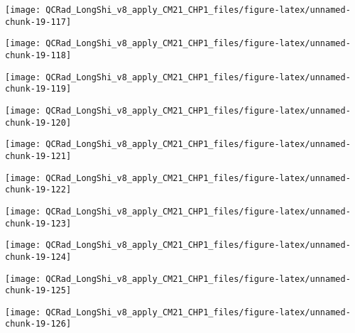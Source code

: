 \documentclass[
  10pt,
  a4paper,oneside]{article}
\begin{document}
\begin{center}\texttt{[image: QCRad\_LongShi\_v8\_apply\_CM21\_CHP1\_files/figure-latex/unnamed-chunk-19-117]} \end{center}

\begin{center}\texttt{[image: QCRad\_LongShi\_v8\_apply\_CM21\_CHP1\_files/figure-latex/unnamed-chunk-19-118]} \end{center}

\begin{center}\texttt{[image: QCRad\_LongShi\_v8\_apply\_CM21\_CHP1\_files/figure-latex/unnamed-chunk-19-119]} \end{center}

\begin{center}\texttt{[image: QCRad\_LongShi\_v8\_apply\_CM21\_CHP1\_files/figure-latex/unnamed-chunk-19-120]} \end{center}

\begin{center}\texttt{[image: QCRad\_LongShi\_v8\_apply\_CM21\_CHP1\_files/figure-latex/unnamed-chunk-19-121]} \end{center}

\begin{center}\texttt{[image: QCRad\_LongShi\_v8\_apply\_CM21\_CHP1\_files/figure-latex/unnamed-chunk-19-122]} \end{center}

\begin{center}\texttt{[image: QCRad\_LongShi\_v8\_apply\_CM21\_CHP1\_files/figure-latex/unnamed-chunk-19-123]} \end{center}

\begin{center}\texttt{[image: QCRad\_LongShi\_v8\_apply\_CM21\_CHP1\_files/figure-latex/unnamed-chunk-19-124]} \end{center}

\begin{center}\texttt{[image: QCRad\_LongShi\_v8\_apply\_CM21\_CHP1\_files/figure-latex/unnamed-chunk-19-125]} \end{center}

\begin{center}\texttt{[image: QCRad\_LongShi\_v8\_apply\_CM21\_CHP1\_files/figure-latex/unnamed-chunk-19-126]} \end{center}
\end{document}

